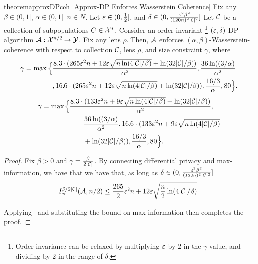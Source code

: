 \begin{restatable}{theorem}{approxDPcoh}
[Approx-DP Enforces Wasserstein Coherence]\label{thm:approx-dp-implies-coherence-enforcement}
    Fix any $\beta \in (0,1]$, $\alpha \in (0,1]$, $n \in N$. Let $\varepsilon \in (0,\frac{1}{2}]$, and $\delta \in (0, \frac{\varepsilon^2 \beta^2}{(120n)^2 |\mathcal{C}|^2}]$ 
    Let $\mathcal{C}$ be a collection of subpopulations $C \in \mathcal{X}^*$. Consider an order-invariant \footnote{Order-invariance can be relaxed by multiplying $\varepsilon$ by $2$ in the $\gamma$ value, and dividing by $2$ in the range of $\delta$.} $(\varepsilon,\delta)$-DP algorithm ${\mathcal{A}:\mathcal{X}^{n/2}\to \mathcal{Y}}$. Fix any lens $\rho$. Then, $\mathcal{A}$ enforces $(\alpha,\beta)$-Wasserstein-coherence with respect to  collection $\mathcal{C}$, lens $\rho$, and size constraint $\gamma$, where
    \ifnum{}
     \begin{align}
        \gamma = \max\Big\{ & \frac{8.3 \cdot (265\varepsilon^2n + 12\varepsilon\sqrt{n\ln(4|\mathcal{C}|/\beta)} + \ln(32|\mathcal{C}|/\beta))}{\alpha^2}, \frac{36\ln((3/\alpha)}{\alpha^2} \nonumber \\
        &, 16.6 \cdot (265\varepsilon^2n + 12\varepsilon\sqrt{n\ln(4|\mathcal{C}|/\beta)} + \ln(32|\mathcal{C}|/\beta)), \frac{16/3}{\alpha}, 80\Big\}.
    \end{align}
    \else
\begin{align}
        \gamma = \max\Big\{ & \frac{8.3 \cdot (133\varepsilon^2n + 9\varepsilon\sqrt{n\ln(4|\mathcal{C}|/\beta)} + \ln(32|\mathcal{C}|/\beta))}{\alpha^2}, \nonumber \\
        & \qquad \frac{36\ln((3/\alpha)}{\alpha^2}, 16.6 \cdot (133\varepsilon^2n + 9\varepsilon\sqrt{n\ln(4|\mathcal{C}|/\beta)} \nonumber \\ 
        & \qquad + \ln(32|\mathcal{C}|/\beta)), \frac{16/3}{\alpha}, 80\Big\}.
\end{align}




 \fi
    
\end{restatable}
\ifnum{}
\begin{proof}
  Fix $\beta > 0$ and $\gamma = \frac{\beta}{2|\mathcal{C}|}$. By  connecting differential privacy and max-information, we have that we have that, as long as $\delta \in (0, \frac{\varepsilon^2 \beta^2}{(120n)^2 |\mathcal{C}|^2}]$ 
  \begin{align*}
  I^{\beta/2|\mathcal{C}|}_{\infty}(\mathcal{A},n/2) \leq \frac{265}{2} \varepsilon^2n + 12\varepsilon\sqrt{\frac{n}{2}\ln(4|\mathcal{C}|/\beta)}. 
  \end{align*}

    Applying~ and substituting the bound on max-information then completes the proof.
    
\end{proof}
\fi